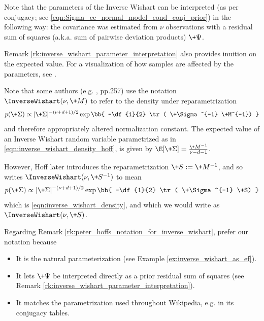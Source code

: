 \documentclass{article} %
\begin{document}
\begin{remark}{}
\label{rk:inverse_wishart_parameter_interpretation}
Note that the parameters of the Inverse Wishart can be interpreted (as per conjugacy;  see \eqref{eqn:Sigma_cc_normal_model_cond_conj_prior}) in the following way: the covariance was estimated from $\nu$ observations with a residual sum of squares (a.k.a.  sum of pairwise deviation products) $\+\Psi$. 
 
\end{remark}

Remark \ref{rk:inverse_wishart_parameter_interpretation} also provides inuition on the expected value.      For a visualization of how samples are affected by the parameters,  see \cite{hughesXXXXinverse}. 

\begin{remark}{}
\label{rk:peter_hoffs_notation_for_inverse_wishart}
Note that some authors (e.g.  \cite{hoff2009first},  pp.257) use the notation $\InverseWishart(\nu,  \+M)$ to refer to the density under reparametrization
\begin{align}
p(\+\Sigma) \propto | \+\Sigma|^{-(\nu+d +1) /2}  \exp \bb{ -\df{1}{2} \tr ( \+\Sigma^{-1} \+M^{-1}) } 
\label{eqn:inverse_wishart_density_hoff}
\end{align}
and therefore appropriately altered normalization constant.  The expected value of an Inverse Wishart random variable parametrized as in   \eqref{eqn:inverse_wishart_density_hoff},  is given by $\E[\+\Sigma] = \frac{\+M^{-1}}{\nu -d -1}$.     

However,  Hoff later introduces the reparametrization $\+S := \+M^{-1}$,  and so writes $\InverseWishart(\nu, \+S^{-1})$ to mean 
\begin{align}
p(\+\Sigma) \propto | \+\Sigma|^{-(\nu+d +1) /2}  \exp \bb{ -\df{1}{2} \tr ( \+\Sigma^{-1} \+S) } 
\label{eqn:inverse_wishart_density_hoffs_alternate}
\end{align}
which is \eqref{eqn:inverse_wishart_density}, and which we would write as $\InverseWishart(\nu, \+S)$.
 
\end{remark}

\begin{remark}{}
Regarding Remark \ref{rk:peter_hoffs_notation_for_inverse_wishart},  prefer our notation because 
\begin{itemize}
\item It is the natural parameterization (see Example \ref{ex:inverse_wishart_as_ef}).
\item It lets $\+\Psi$ be interpreted directly as a prior residual sum of squares (see Remark \ref{rk:inverse_wishart_parameter_interpretation}). 
\item It matches the parametrization used throughout Wikipedia,  e.g. in its conjugacy tables.
\end{itemize}
 
\end{remark}
\end{document}
